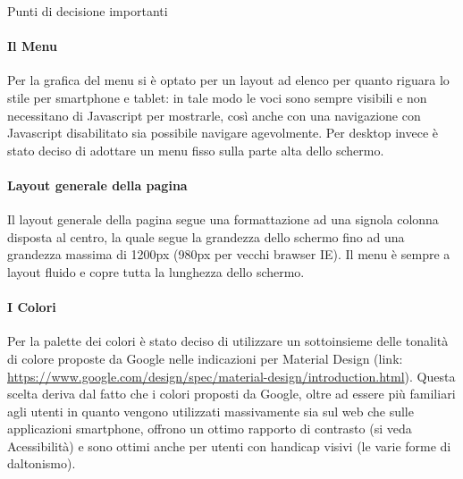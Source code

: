Punti di decisione importanti

\paragraph*{Il Menu}
Per la grafica del menu si è optato per un layout ad elenco per quanto riguara lo stile per smartphone e tablet: in tale modo le voci sono sempre visibili e non necessitano di Javascript per mostrarle, così anche con una navigazione con Javascript disabilitato sia possibile navigare agevolmente.
Per desktop invece è stato deciso di adottare un menu fisso sulla parte alta dello schermo.

\paragraph*{Layout generale della pagina}
Il layout generale della pagina segue una formattazione ad una signola colonna disposta al centro, la quale segue la grandezza dello schermo fino ad una grandezza massima di 1200px (980px per vecchi brawser IE).
Il menu è sempre a layout fluido e copre tutta la lunghezza dello schermo.

\paragraph*{I Colori}
Per la palette dei colori è stato deciso di utilizzare un sottoinsieme delle tonalità di colore proposte da Google nelle indicazioni per Material Design (link:  \url{https://www.google.com/design/spec/material-design/introduction.html}). Questa scelta deriva dal fatto che i colori proposti da Google, oltre ad essere più familiari agli utenti in quanto vengono utilizzati massivamente sia sul web che sulle applicazioni smartphone, offrono un ottimo rapporto di contrasto (si veda Acessibilità) e sono ottimi anche per utenti con handicap visivi (le varie forme di daltonismo).
